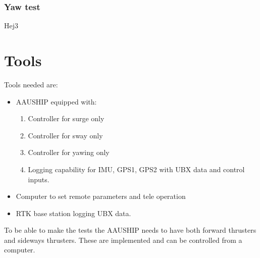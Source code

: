 \subsubsection{Yaw test}


Hej3


\section{Tools}
Tools needed are:
\begin{itemize}
	\item AAUSHIP equipped with:
		\begin{enumerate}
			\item Controller for surge only
			\item Controller for sway only
			\item Controller for yawing only
			\item Logging capability for \ac{IMU}, GPS1, GPS2 with UBX data
				and control inputs.
		\end{enumerate}
	\item Computer to set remote parameters and tele operation
	\item RTK base station logging UBX data.
\end{itemize}
To be able to make the tests the AAUSHIP needs to have both forward thrusters and sideways thrusters. These are implemented and can be controlled from a computer.

